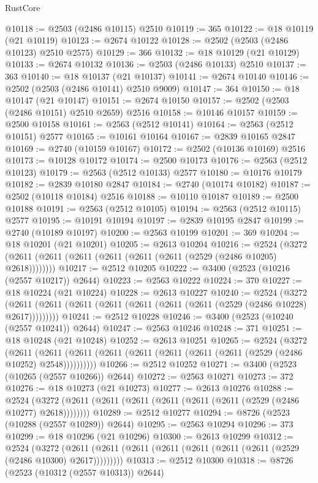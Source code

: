 \begin{lexlean}{RustCore}
\begin{coremodule}
@10118 := @2503 (@2486 @10115) @2510
@10119 := 365
@10122 := @18 @10119 (@21 @10119)
@10123 := @2674 @10122
@10128 := @2502 (@2503 (@2486 @10123) @2510 @2575)
@10129 := 366
@10132 := @18 @10129 (@21 @10129)
@10133 := @2674 @10132
@10136 := @2503 (@2486 @10133) @2510
@10137 := 363
@10140 := @18 @10137 (@21 @10137)
@10141 := @2674 @10140
@10146 := @2502 (@2503 (@2486 @10141) @2510 @9009)
@10147 := 364
@10150 := @18 @10147 (@21 @10147)
@10151 := @2674 @10150
@10157 := @2502 (@2503 (@2486 @10151) @2510 @2659) @2516
@10158 := @10146 @10157
@10159 := @2500 @10158
@10161 := @2563 (@2512 @10141)
@10164 := @2563 (@2512 @10151) @2577
@10165 := @10161 @10164
@10167 := @2839 @10165 @2847
@10169 := @2740 (@10159 @10167)
@10172 := @2502 (@10136 @10169) @2516
@10173 := @10128 @10172
@10174 := @2500 @10173
@10176 := @2563 (@2512 @10123)
@10179 := @2563 (@2512 @10133) @2577
@10180 := @10176 @10179
@10182 := @2839 @10180 @2847
@10184 := @2740 (@10174 @10182)
@10187 := @2502 (@10118 @10184) @2516
@10188 := @10110 @10187
@10189 := @2500 @10188
@10191 := @2563 (@2512 @10105)
@10194 := @2563 (@2512 @10115) @2577
@10195 := @10191 @10194
@10197 := @2839 @10195 @2847
@10199 := @2740 (@10189 @10197)
@10200 := @2563 @10199
@10201 := 369
@10204 := @18 @10201 (@21 @10201)
@10205 := @2613 @10204
@10216 := @2524 (@3272 (@2611 (@2611 (@2611 (@2611 (@2611 (@2611 (@2529 (@2486 @10205) @2618))))))))
@10217 := @2512 @10205
@10222 := @3400 (@2523 (@10216 (@2557 @10217)) @2644)
@10223 := @2563 @10222
@10224 := 370
@10227 := @18 @10224 (@21 @10224)
@10228 := @2613 @10227
@10240 := @2524
    (@3272 (@2611 (@2611 (@2611 (@2611 (@2611 (@2611 (@2611 (@2529 (@2486 @10228) @2617)))))))))
@10241 := @2512 @10228
@10246 := @3400 (@2523 (@10240 (@2557 @10241)) @2644)
@10247 := @2563 @10246
@10248 := 371
@10251 := @18 @10248 (@21 @10248)
@10252 := @2613 @10251
@10265 := @2524
    (@3272
      (@2611 (@2611 (@2611 (@2611 (@2611 (@2611 (@2611 (@2611 (@2529 (@2486 @10252) @2548))))))))))
@10266 := @2512 @10252
@10271 := @3400 (@2523 (@10265 (@2557 @10266)) @2644)
@10272 := @2563 @10271
@10273 := 372
@10276 := @18 @10273 (@21 @10273)
@10277 := @2613 @10276
@10288 := @2524 (@3272 (@2611 (@2611 (@2611 (@2611 (@2611 (@2611 (@2529 (@2486 @10277) @2618))))))))
@10289 := @2512 @10277
@10294 := @8726 (@2523 (@10288 (@2557 @10289)) @2644)
@10295 := @2563 @10294
@10296 := 373
@10299 := @18 @10296 (@21 @10296)
@10300 := @2613 @10299
@10312 := @2524
    (@3272 (@2611 (@2611 (@2611 (@2611 (@2611 (@2611 (@2611 (@2529 (@2486 @10300) @2617)))))))))
@10313 := @2512 @10300
@10318 := @8726 (@2523 (@10312 (@2557 @10313)) @2644)

\end{coremodule}
\end{lexlean}
